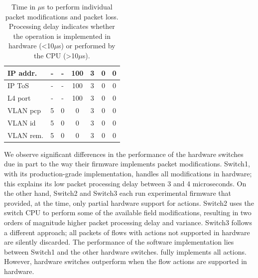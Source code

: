 \begin{table}[tb]
\begin{flushleft}
\begin{tabular}[t]{ |l | c | c | c || c | c | c | }
          \hline  
          IP addr. & - & - &  100 & 3 & 0 & 0 \\
          \hline  
          IP ToS & - & - & 100 & 3 & 0 & 0 \\
          \hline  
          L4 port & - & - & 100 & 3 & 0 & 0 \\
          \hline  
          VLAN pcp & 5 & 0 & 0 & 3 & 0 & 0 \\
          \hline  
          VLAN id & 5 & 0 & 0 & 3 & 0 & 0  \\
          \hline  
          VLAN rem. & 5 & 0 & 0 & 3 & 0 & 0 \\
      \hline
    \end{tabular}
 
\caption{Time in $\mu$s to perform individual packet modifications and packet
loss. Processing delay indicates whether the operation is
  implemented in hardware (\textless10$\mu$s) or performed by the CPU (\textgreater10$\mu$s).}
  \label{tbl:feature_delay}
\end{flushleft}
\end{table}

We observe significant differences in the performance of the hardware
switches due in part to the way their firmware implements packet
modifications. Switch1, with its production-grade implementation,
handles all modifications in hardware; this explains its low packet
processing delay between 3 and 4 microseconds. On the other hand,
Switch2 and Switch3 each run experimental firmware that provided, at the time, only
partial hardware support for \of actions. Switch2 uses the switch
CPU to perform some of the available field modifications, resulting in two orders
of magnitude higher packet processing delay and variance.
Switch3 follows a different approach; all packets of flows with
actions not supported in hardware are silently discarded. The
performance of the \ovs software implementation lies between
Switch1 and the other hardware switches.  \ovs fully implements
all \of actions. However, hardware switches outperform
\ovs when the flow actions are supported in hardware.
%

